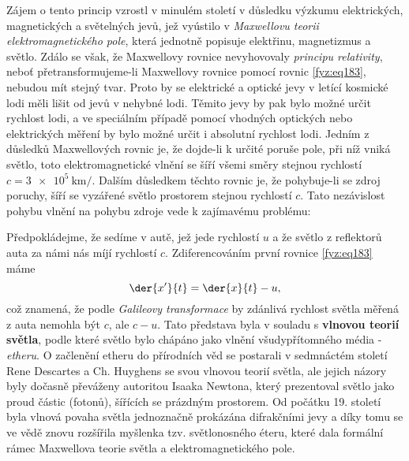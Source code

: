     Zájem o tento princip vzrostl v minulém století v důsledku výzkumu elektrických, magnetických a
    světelných jevů, jež vyústilo v \emph{Maxwellovu teorii elektromagnetického pole}, která
    jednotně popisuje elektřinu, magnetizmus a světlo. Zdálo se však, že Maxwellovy rovnice
    nevyhovovaly \emph{principu relativity}, neboť přetransformujeme-li Maxwellovy rovnice pomocí
    rovnic \ref{fyz:eq183}, nebudou mít stejný tvar. Proto by se elektrické a optické jevy v letící
    kosmické lodi měli lišit od jevů v nehybné lodi. Těmito jevy by pak bylo možné určit rychlost
    lodi, a ve speciálním případě pomocí vhodných optických nebo elektrických měření by bylo možné
    určit i absolutní rychlost lodi. Jedním z důsledků Maxwellových rovnic je, že dojde-li k určité
    poruše pole, při níž vniká světlo, toto elektromagnetické vlnění se šíří všemi směry stejnou
    rychlostí \(c = \SI{3e5}{\km\per}\). Dalším důsledkem těchto rovnic je, že pohybuje-li se zdroj
    poruchy, šíří se vyzářené světlo prostorem stejnou rychlostí \(c\). Tato nezávislost pohybu
    vlnění na pohybu zdroje vede k zajímavému problému:
    
    Předpokládejme, že sedíme v autě, jež jede rychlostí \(u\) a že světlo z reflektorů auta za 
    námi nás míjí rychlostí \(c\). Zdiferencováním první rovnice \ref{fyz:eq183} máme
    \begin{equation}\label{fyz:eq184}
      \der{x'}{t} =\der{x}{t} - u, 
    \end{equation}       
    což znamená, že podle \emph{Galileovy transformace} by zdánlivá rychlost světla měřená z auta
    nemohla být \(c\), ale \(c-u\). Tato představa byla v souladu s \textbf{vlnovou teorií světla},
    podle které světlo bylo chápáno jako vlnění všudypřítomného média - \emph{etheru}.  O začlenění
    etheru do přírodních věd se postarali v sedmnáctém století Rene Descartes a Ch. Huyghens se svou
    vlnovou teorií světla, ale jejich názory byly dočasně převáženy autoritou Isaaka Newtona, který
    prezentoval světlo jako proud částic (fotonů), šířících se prázdným prostorem. Od počátku 19.
    století byla vlnová povaha světla jednoznačně prokázána difrakčními jevy a díky tomu se ve vědě
    znovu rozšířila myšlenka tzv. světlonosného éteru, které dala formální rámec Maxwellova teorie
    světla a elektromagnetického pole.  
    

